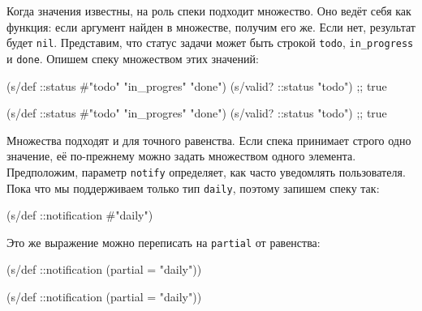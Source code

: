 Когда значения известны, на роль спеки подходит множество. Оно ведёт себя как
функция: если аргумент найден в множестве, получим его же. Если нет, результат
будет \verb|nil|. Представим, что статус задачи может быть строкой
\verb|todo|, \verb|in_progress| и \verb|done|. Опишем спеку множеством
этих значений:

\ifx\devicetype\mobile

\begin{english}
  \begin{clojure}
(s/def ::status
  #{"todo" "in_progres" "done"})
(s/valid? ::status "todo") ;; true
  \end{clojure}
\end{english}

\else

\begin{english}
  \begin{clojure}
(s/def ::status #{"todo" "in_progres" "done"})
(s/valid? ::status "todo") ;; true
  \end{clojure}
\end{english}

\fi

Множества подходят и для точного равенства. Если спека принимает строго одно
значение, её по-прежнему можно задать множеством одного
элемента. Предположим, параметр \verb|notify| определяет, как часто уведомлять
пользователя. Пока что мы поддерживаем только тип \verb|daily|, поэтому
запишем спеку так:

\begin{english}
  \begin{clojure}
(s/def ::notification #{"daily"})
  \end{clojure}
\end{english}

\noindent
Это же выражение можно переписать на \verb|partial| от равенства:

\ifx\devicetype\mobile

\begin{english}
  \begin{clojure}
(s/def ::notification
  (partial = "daily"))
  \end{clojure}
\end{english}

\else

\begin{english}
  \begin{clojure}
(s/def ::notification (partial = "daily"))
  \end{clojure}
\end{english}


